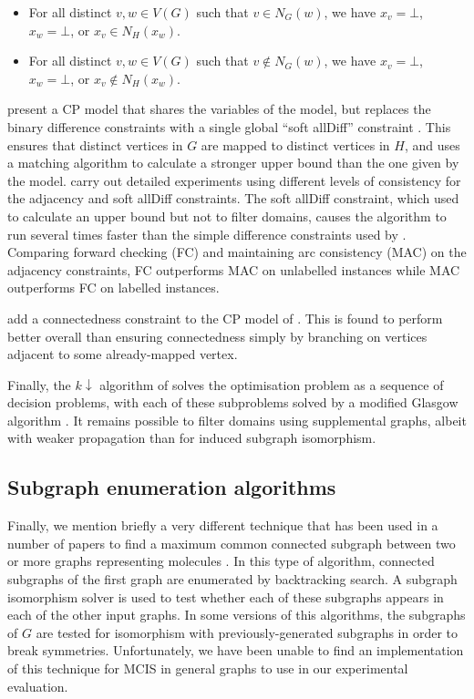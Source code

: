 \begin{itemize}
    \item For all distinct $v, w \in V(G)$ such that $v \in N_G(w)$, we have 
$x_v=\bot$,
$x_w=\bot$, or
$x_v \in N_H(x_w)$.
\item For all distinct $v, w \in V(G)$ such that $v \not\in N_G(w)$, we have 
$x_v=\bot$,
$x_w=\bot$, or
$x_v \not\in N_H(x_w)$.
\end{itemize}

\citet{DBLP:conf/cp/NdiayeS11} present a CP model that shares the variables
of the \citeauthor{DBLP:conf/mco/VismaraV08} model, but replaces the binary difference
constraints with a single global ``soft allDiff''
constraint \citep{DBLP:conf/cp/PetitRB01}.  This ensures that distinct vertices
in $G$ are mapped to distinct vertices in $H$, and uses a matching algorithm
to calculate a stronger upper bound than the one given by
the \citeauthor{DBLP:conf/mco/VismaraV08} model.
\citeauthor{DBLP:conf/cp/NdiayeS11} carry out detailed experiments using
different levels of consistency for the adjacency and soft allDiff constraints.
The soft allDiff constraint, which used to calculate an upper bound but
not to filter domains, causes the algorithm to run several times faster
than the simple difference constraints used by \citeauthor{DBLP:conf/mco/VismaraV08}.
Comparing forward checking (FC) and maintaining arc consistency (MAC)
on the adjacency constraints, FC outperforms MAC on unlabelled instances
while MAC outperforms FC on labelled instances.

\cite{DBLP:conf/cp/McCreeshNPS16} add a connectedness constraint to the CP
model of \citet{DBLP:conf/cp/NdiayeS11}.  This is found to perform better
overall than ensuring connectedness simply by branching on vertices adjacent to
some already-mapped vertex.

Finally, the $k\downarrow$ algorithm of \citep{UpcomingAAAIPaper}
solves the optimisation problem as a sequence of decision problems, with
each of these subproblems solved by a modified Glasgow algorithm
\citep{DBLP:conf/cp/McCreeshP15}.  It remains possible to filter
domains using supplemental graphs, albeit with weaker propagation
than for induced subgraph isomorphism.

\subsection{Subgraph enumeration algorithms}

Finally, we mention briefly a very different technique that has been used
in a number of papers to find a maximum common connected subgraph between two or more
graphs representing molecules
\citep{armitage1967automatic,takahashi1987recognition,DBLP:journals/jcheminf/DalkeH13}.
In this type of algorithm, connected
subgraphs of the first graph are enumerated by backtracking search.
A subgraph isomorphism solver is used to test whether each of these subgraphs
appears in each of the other input graphs.  In some versions of this algorithms,
the subgraphs of $G$ are tested for isomorphism with previously-generated subgraphs
in order to break symmetries.
Unfortunately, we have been unable to find an implementation of this technique
for MCIS in general graphs to use in our experimental evaluation.

